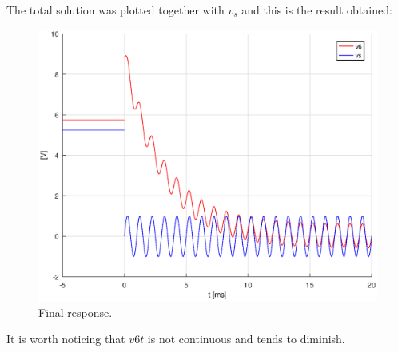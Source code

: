 The total solution was plotted together with $v_s$ and this is the result obtained:

\begin{figure}[H] \centering
\includegraphics[width=0.6\linewidth]{Theoretical5.eps}
\caption{Final response.}
\label{fig:point5}
\end{figure}

It is worth noticing that $v6t$ is not continuous and tends to diminish.

